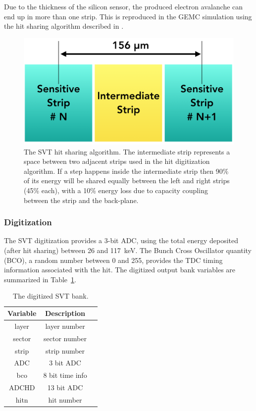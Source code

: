 Due to the thickness of the silicon sensor, the produced electron avalanche can end up in more than one strip. This
is reproduced in the GEMC simulation using the hit sharing algorithm described in .

\begin{figure}[t]
	\centering
	\includegraphics[width=0.99\columnwidth, keepaspectratio]{img/bstHitSharing.png}
	\caption{The SVT hit sharing algorithm. The intermediate strip represents a space between two adjacent strips
          used in the hit digitization algorithm. If a step happens inside the intermediate strip then 90\% of its energy
          will be shared equally between the left and right strips (45\% each), with a 10\% energy loss due to capacity
          coupling between the strip and the back-plane.}
	\label{fig:bstHitSharing}
\end{figure}

\subsubsection{Digitization}

The SVT digitization provides a 3-bit ADC, using the total energy deposited (after hit sharing) between 26 and 117~keV.
The Bunch Cross Oscillator quantity (BCO), a random number between 0 and 255, provides the TDC timing information
associated with the hit. The digitized output bank variables are summarized in Table~\ref{tab:bstBank}.

\begin{table}[h]
	\begin{center}
		\begin{tabular}{| c | c | c |}
			\hline \hline
			Variable  & Description   \\
			\hline
               layer  &        layer number    \\
              sector  &       sector number    \\
               strip  &        strip number    \\
                 ADC  &           3 bit ADC    \\
                 bco  &     8 bit time info    \\
               ADCHD  &          13 bit ADC    \\
                hitn  &          hit number    \\
			\hline \hline
		\end{tabular}
	\end{center}
	\caption{The digitized SVT bank.}
        \label{tab:bstBank}
\end{table}

